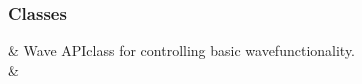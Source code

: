 \documentclass[letterpaper,10pt,english]{sphinxmanual}
\begin{document}
\subsubsection{Classes}
\label{\detokenize{autoapi/unduwave/index:classes}}

\begin{savenotes}\sphinxattablestart
\sphinxthistablewithglobalstyle
\sphinxthistablewithnovlinesstyle
\centering
\begin{tabulary}{\linewidth}[t]{}
\sphinxtoprule
\sphinxtableatstartofbodyhook
\sphinxAtStartPar
{\hyperref[\detokenize{autoapi/unduwave/index:unduwave.wave}]{}}
&
\sphinxAtStartPar
Wave API\sphinxhyphen{}class for controlling basic wave\sphinxhyphen{}functionality.
\\
\sphinxhline
\sphinxAtStartPar
{\hyperref[\detokenize{autoapi/unduwave/index:unduwave.undu}]{}}
&
\sphinxAtStartPar


\end{tabulary}
\end{savenotes}
\end{document}
